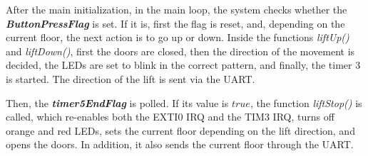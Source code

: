 After the main initialization, in the main loop, the system checks whether the \textbf{\textit{ButtonPressFlag}} is set. If it is, first the flag is reset, and, depending on the current floor, the next action is to go up or down. Inside the functions \textit{liftUp()} and \textit{liftDown()}, first the doors are closed, then the direction of the movement is decided, the LEDs are set to blink in the correct pattern, and finally, the timer 3 is started. The direction of the lift is sent via the UART.
\medskip

Then, the \textbf{\textit{timer5EndFlag}} is polled. If its value is $true$, the function \textit{liftStop()} is called, which re-enables both the EXTI0 IRQ and the TIM3 IRQ, turns off orange and red LEDs, sets the current floor depending on the lift direction, and opens the doors. In addition, it also sends the current floor through the UART.

